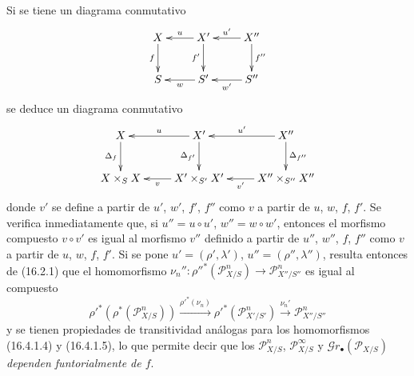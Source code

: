 \begin{env}[16.4.2]
\label{IV.16.4.2}

Si se tiene un diagrama conmutativo
\[
  \xymatrix{
    X \ar[d]_-{f} & X' \ar[l]_-u \ar[d]_-{f'} &
      X'' \ar[l]_-{u'} \ar[d]^-{f''} \\
    S & S' \ar[l]^-w & S'' \ar[l]^-{w'}
  }
\]
se deduce un diagrama conmutativo
\[
  \xymatrix{
    X \ar[d]_-{\Delta_f} & X' \ar[l]_-u \ar[d]_-{\Delta_{f'}} &
      X'' \ar[l]_-{u'} \ar[d]^-{\Delta_{f''}} \\
    X\times_S X & X'\times_{S'}X' \ar[l]^-v &
      X''\times_{S''}X'' \ar[l]^-{v'}
  }
\]
donde $v'$ se define a partir de $u'$, $w'$, $f'$, $f''$ como $v$ a partir de
$u$, $w$, $f$, $f'$. Se verifica inmediatamente que, si $u''=u\circ u'$,
$w''=w\circ w'$, entonces el morfismo compuesto $v\circ v'$ es igual al morfismo
$v''$ definido a partir de $u''$, $w''$, $f$, $f''$ como $v$ a partir de $u$,
$w$, $f$, $f'$. Si se pone $u'=(\rho',\lambda')$,
$u''=(\rho'',\lambda'')$, resulta entonces de (16.2.1) que el homomorfismo
$\nu_n'':\rho''^*(\mathscr{P}_{X/S}^n)\to\mathscr{P}_{X''/S''}^n$ es igual al
compuesto
\[
  \rho'^*(\rho^*(\mathscr{P}_{X/S}^n))
  \xrightarrow{\rho'^*(\nu_n)}
  \rho'^*(\mathscr{P}_{X'/S'}^n)
  \xrightarrow{\nu_n'}\mathscr{P}_{X''/S''}^n
\]
y se tienen propiedades de transitividad análogas para los homomorfismos
(16.4.1.4) y (16.4.1.5), lo que permite decir que los
$\mathscr{P}_{X/S}^n$, $\mathscr{P}_{X/S}^\infty$ y
$\mathscr{G}r_\bullet(\mathscr{P}_{X/S})$ \emph{dependen funtorialmente de $f$}.
\end{env}

